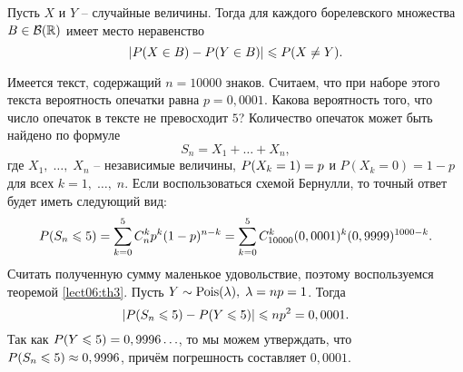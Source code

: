 \begin{lemma}\label{lect06:lemma2}
Пусть $X$ и $Y$ -- случайные величины. Тогда для каждого борелевского множества $B\in\mathcal{B}(\R)$ имеет место неравенство
\[ \left|\P(X\in B)-\P(Y\in B)\right|\leqslant\P(X\neq Y). \]  
\end{lemma}

\begin{example}\label{lect06:ex4}
Имеется текст, содержащий $n=10000$ знаков. Считаем, что при наборе этого текста вероятность опечатки равна $p=0,0001$. Какова вероятность того, что число опечаток в тексте не превосходит $5$? Количество опечаток может быть найдено по формуле
\[ S_n=X_1+\ldots+X_n, \]
где $X_1,\;\ldots,\;X_n$ -- независимые величины, $\P(X_k=1)=p$ и $P(X_k=0)=1-p$ для всех $k=1,\;\ldots,\;n$. Если воспользоваться схемой Бернулли, то точный ответ будет иметь следующий вид:
\[ \P(S_n\leqslant 5)=\sum_{k=0}^5C_n^kp^k(1-p)^{n-k}=\sum_{k=0}^5C_{10000}^k(0,0001)^k(0,9999)^{1000-k}. \]
Считать полученную сумму маленькое удовольствие, поэтому воспользуемся теоремой \ref{lect06:th3}. Пусть $Y\sim\textnormal{Pois}(\lambda),\;\lambda=np=1$. Тогда
\[ \left|\P(S_n\leqslant 5)-\P(Y\leqslant 5)\right|\leqslant np^2=0,0001. \]
Так как $\P(Y\leqslant 5)=0,9996\ldots$, то мы можем утверждать, что $\P(S_n\leqslant 5)\approx 0,9996$, причём погрешность составляет $0,0001$.
\end{example}

